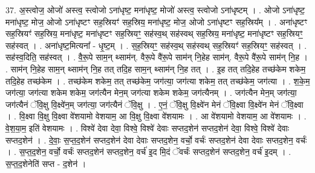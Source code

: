 \documentclass[17pt]{extarticle}
\begin{document}
37. अ॒स्त्वोज॒ ओजो॑ अस्त्व॒ स्त्वोजो ऽना॑धृष्ट॒ मना॑धृष्ट॒ मोजो॑ अस्त्व॒ स्त्वोजो ऽना॑धृष्टम् । . ओजो ऽना॑धृष्ट॒ मना॑धृष्ट॒ मोज॒ ओजो ऽना॑धृष्टꣳ सह॒स्रियꣳ॑ सह॒स्रिय॒ मना॑धृष्ट॒ मोज॒ ओजो ऽना॑धृष्टꣳ सह॒स्रिय᳚म् । . अना॑धृष्टꣳ सह॒स्रियꣳ॑ सह॒स्रिय॒ मना॑धृष्ट॒ मना॑धृष्टꣳ सह॒स्रियꣳ॒॒ सह॑स्व॒थ् सह॑स्वथ् सह॒स्रिय॒ मना॑धृष्ट॒ मना॑धृष्टꣳ सह॒स्रियꣳ॒॒ सह॑स्वत् । . अना॑धृष्ट॒मित्यना᳚ - धृ॒ष्ट॒म् । . स॒ह॒स्रियꣳ॒॒ सह॑स्व॒थ् सह॑स्वथ् सह॒स्रियꣳ॑ सह॒स्रियꣳ॒॒ सह॑स्वत् । . सह॑स्व॒दिति॒ सह॑स्वत् । . वै॒रू॒पे साम॒न् थ्साम॑न्. वैरू॒पे वै॑रू॒पे साम॑न् नि॒हेह साम॑न्. वैरू॒पे वै॑रू॒पे साम॑न् नि॒ह । . साम॑न् नि॒हेह साम॒न् थ्साम॑न् नि॒ह तत् तदि॒ह साम॒न् थ्साम॑न् नि॒ह तत् । . इ॒ह तत् तदि॒हेह तच्छ॑केम शकेम॒ तदि॒हेह तच्छ॑केम । . तच्छ॑केम शकेम॒ तत् तच्छ॑केम॒ जग॑त्या॒ जग॑त्या शकेम॒ तत् तच्छ॑केम॒ जग॑त्या । . श॒के॒म॒ जग॑त्या॒ जग॑त्या शकेम शकेम॒ जग॑त्यैन मेन॒म् जग॑त्या शकेम शकेम॒ जग॑त्यैनम् । . जग॑त्यैन मेन॒म् जग॑त्या॒ जग॑त्यैनं ॅवि॒क्षु वि॒क्ष्वे॑न॒म् जग॑त्या॒ जग॑त्यैनं ॅवि॒क्षु । . ए॒नं॒ ॅवि॒क्षु वि॒क्ष्वे॑न मेनं ॅवि॒क्ष्वा वि॒क्ष्वे॑न मेनं ॅवि॒क्ष्वा । . वि॒क्ष्वा वि॒क्षु वि॒क्ष्वा वे॑शयामो वेशयाम॒ आ वि॒क्षु वि॒क्ष्वा वे॑शयामः । . आ वे॑शयामो वेशयाम॒ आ वे॑शयामः । . वे॒श॒या॒म॒ इति॑ वेशयामः । . विश्वे॑ देवा देवा॒ विश्वे॒ विश्वे॑ देवाः सप्तद॒शेन॑ सप्तद॒शेन॑ देवा॒ विश्वे॒ विश्वे॑ देवाः सप्तद॒शेन॑ । . दे॒वाः॒ स॒प्त॒द॒शेन॑ सप्तद॒शेन॑ देवा देवाः सप्तद॒शेन॒ वर्चो॒ वर्चः॑ सप्तद॒शेन॑ देवा देवाः सप्तद॒शेन॒ वर्चः॑ । . स॒प्त॒द॒शेन॒ वर्चो॒ वर्चः॑ सप्तद॒शेन॑ सप्तद॒शेन॒ वर्च॑ इ॒द मि॒दं ॅवर्चः॑ सप्तद॒शेन॑ सप्तद॒शेन॒ वर्च॑ इ॒दम् । . स॒प्त॒द॒शेनेति॑ सप्त - द॒शेन॑ । \newline
\pagebreak
{}
\end{document}
